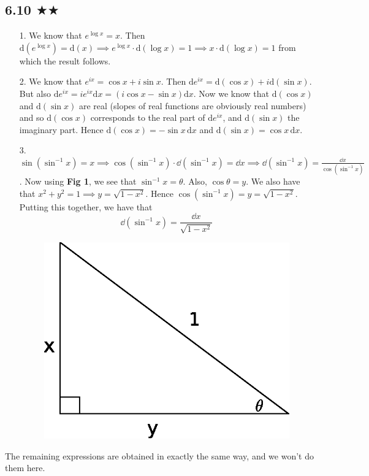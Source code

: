 \subsection{6.10 $\bigstar\bigstar$}
\begin{itemize}
\item[1.] We know that $e^{\log x}=x$. Then $\text{d}(e^{\log x})=\text{d}(x)\implies e^{\log x}\cdot \text{d}(\log x)=1\implies x \cdot \text{d}(\log x)=1 $ from which the result follows.
\item[2.] We know that $e^{i x}=\cos x +i\sin x$. Then $\text{d}e^{ix}=\text{d}(\cos x) +i\text{d}(\sin x)$. But also $\text{d}e^{ix}=i e^{ix} \text{d}x=(i\cos x -\sin x)\text{d}x$. Now we know that $\text{d}(\cos x)$ and $\text{d}(\sin x)$ are real (slopes of real functions are obviously real numbers) and so $\text{d}(\cos x)$ corresponds to the real part of $\text{d}e^{ix}$, and $\text{d}(\sin x)$ the imaginary part. Hence $\text{d}(\cos x)=-\sin x\,\text{d}x$ and $\text{d}(\sin x)=\cos x \,\text{d}x$. 
\item[3.] $\sin(\sin^{-1}x)=x\implies \cos(\sin^{-1}x)\cdot\dd (\sin^{-1}x)=\dd x\implies \dd (\sin^{-1}x)=\frac{\dd x}{\cos(\sin^{-1}x)}$. Now using \textbf{Fig 1}, we see that $\sin^{-1}x=\theta$. Also, $\cos\theta=y$. We also have that $x^2+y^2=1\implies y=\sqrt{1-x^2}$. Hence $\cos(\sin^{-1}x)=y=\sqrt{1-x^2}$. Putting this together, we have that
$$\dd (\sin^{-1}x)=\frac{\dd x}{\sqrt{1-x^2}}$$
\begin{figure}
\includegraphics[scale=0.5]{chapters/images/triangle.eps}
\caption{  }
\end{figure} 
\end{itemize}
The remaining expressions are obtained in exactly the same way, and we won't do them here. 



